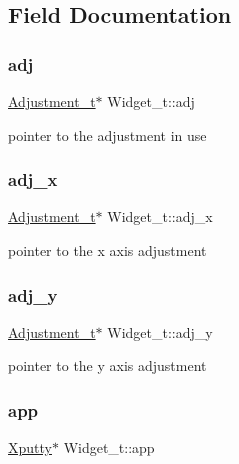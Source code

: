 \subsection{Field Documentation}
\mbox{\label{structWidget__t_af3fdf65eb9a663016b91ee87a96d75a8}} 
\subsubsection{\texorpdfstring{adj}{adj}}
{\footnotesize\ttfamily \hyperlink{structAdjustment__t}{Adjustment\+\_\+t}$\ast$ Widget\+\_\+t\+::adj}

pointer to the adjustment in use \mbox{\label{structWidget__t_aabc05e0a46c85d24483fae36127b45dd}} 
\subsubsection{\texorpdfstring{adj\+\_\+x}{adj\_x}}
{\footnotesize\ttfamily \hyperlink{structAdjustment__t}{Adjustment\+\_\+t}$\ast$ Widget\+\_\+t\+::adj\+\_\+x}

pointer to the x axis adjustment \mbox{\label{structWidget__t_abde95d3fb49faff5dd852f16810115e7}} 
\subsubsection{\texorpdfstring{adj\+\_\+y}{adj\_y}}
{\footnotesize\ttfamily \hyperlink{structAdjustment__t}{Adjustment\+\_\+t}$\ast$ Widget\+\_\+t\+::adj\+\_\+y}

pointer to the y axis adjustment \mbox{\label{structWidget__t_a06eaa5b134c47983fd965e745cdbaa3b}} 
\subsubsection{\texorpdfstring{app}{app}}
{\footnotesize\ttfamily \hyperlink{structXputty}{Xputty}$\ast$ Widget\+\_\+t\+::app}

